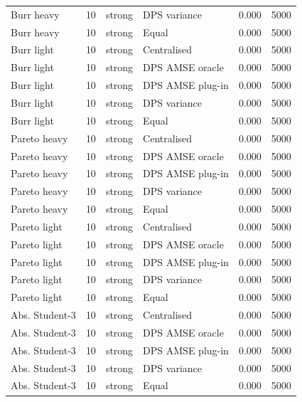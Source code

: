 \begin{tabular}{lrllrr}
Burr heavy & 10 & strong & DPS variance & 0.000 & 5000 \\
Burr heavy & 10 & strong & Equal & 0.000 & 5000 \\
Burr light & 10 & strong & Centralised & 0.000 & 5000 \\
Burr light & 10 & strong & DPS AMSE oracle & 0.000 & 5000 \\
Burr light & 10 & strong & DPS AMSE plug-in & 0.000 & 5000 \\
Burr light & 10 & strong & DPS variance & 0.000 & 5000 \\
Burr light & 10 & strong & Equal & 0.000 & 5000 \\
Pareto heavy & 10 & strong & Centralised & 0.000 & 5000 \\
Pareto heavy & 10 & strong & DPS AMSE oracle & 0.000 & 5000 \\
Pareto heavy & 10 & strong & DPS AMSE plug-in & 0.000 & 5000 \\
Pareto heavy & 10 & strong & DPS variance & 0.000 & 5000 \\
Pareto heavy & 10 & strong & Equal & 0.000 & 5000 \\
Pareto light & 10 & strong & Centralised & 0.000 & 5000 \\
Pareto light & 10 & strong & DPS AMSE oracle & 0.000 & 5000 \\
Pareto light & 10 & strong & DPS AMSE plug-in & 0.000 & 5000 \\
Pareto light & 10 & strong & DPS variance & 0.000 & 5000 \\
Pareto light & 10 & strong & Equal & 0.000 & 5000 \\
Abs. Student-3 & 10 & strong & Centralised & 0.000 & 5000 \\
Abs. Student-3 & 10 & strong & DPS AMSE oracle & 0.000 & 5000 \\
Abs. Student-3 & 10 & strong & DPS AMSE plug-in & 0.000 & 5000 \\
Abs. Student-3 & 10 & strong & DPS variance & 0.000 & 5000 \\
Abs. Student-3 & 10 & strong & Equal & 0.000 & 5000 \\
\bottomrule
\end{tabular}
